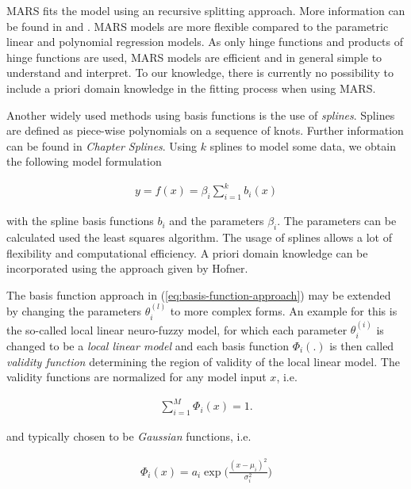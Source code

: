 \documentclass[10pt,a4paper]{article}
\begin{document}
MARS fits the model using an recursive splitting approach. More information can be found in \cite{friedman1991multivariate} and \cite{friedman2001elements}. MARS models are more flexible compared to the parametric linear and polynomial regression models. As only hinge functions and products of hinge functions are used, MARS models are efficient and in general simple to understand and interpret. To our knowledge, there is currently no possibility to include a priori domain knowledge in the fitting process when using MARS. 

Another widely used methods using basis functions is the use of \emph{splines}. Splines are defined as piece-wise polynomials on a sequence of knots. Further information can be found in \emph{Chapter Splines}. \cite{deBoor1978practicalGuideToSplines} Using $k$ splines to model some data, we obtain the following model formulation

\begin{align} \label{eq:Spline-basis-formulation}
	y = f(x) = \beta_i \sum_{i=1}^k b_i(x) 
\end{align}

with the spline basis functions $b_i$ and the parameters $\beta_i$. The parameters can be calculated used the least squares algorithm. The usage of splines allows a lot of flexibility and computational efficiency. A priori domain knowledge can be incorporated using the approach given by Hofner.\cite{hofner2011monotonicity}

The basis function approach in (\ref{eq:basis-function-approach}) may be extended by changing the parameters $\theta_i^{(l)}$ to more complex forms. An example for this is the so-called local linear neuro-fuzzy model, for which each parameter $\theta_i^{(i)}$ is changed to be a \emph{local linear model} and each basis function $\Phi_i(.)$ is then called \emph{validity function} determining the region of validity of the local linear model. \cite{nelles2013nonlinear} The validity functions are normalized for any model input $x$, i.e.

\begin{align} \label{eq:LILOMOT-normalized-basis-fucntions}
	\sum_{i=1}^M \Phi_i(x) = 1.
\end{align}

and typically chosen to be \emph{Gaussian} functions, i.e. 

\begin{align} \label{eq:validity-function}
	\Phi_i(x) = a_i \exp \big(\frac{(x - \mu_i)^2}{\sigma_i^2} \big)	
\end{align}
\end{document}
